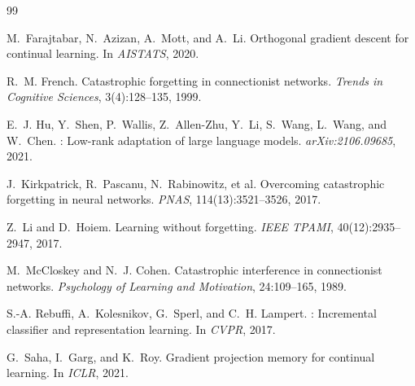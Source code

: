 \documentclass[11pt]{article}
\begin{document}

\begin{thebibliography}{99}

M.~Farajtabar, N.~Azizan, A.~Mott, and A.~Li.
\newblock Orthogonal gradient descent for continual learning.
\newblock In \emph{AISTATS}, 2020.

R.~M. French.
\newblock Catastrophic forgetting in connectionist networks.
\newblock \emph{Trends in Cognitive Sciences}, 3(4):128--135, 1999.

E.~J. Hu, Y.~Shen, P.~Wallis, Z.~Allen-Zhu, Y.~Li, S.~Wang, L.~Wang, and
W.~Chen.
: Low-rank adaptation of large language models.
\newblock \emph{arXiv:2106.09685}, 2021.

J.~Kirkpatrick, R.~Pascanu, N.~Rabinowitz, et al.
\newblock Overcoming catastrophic forgetting in neural networks.
\newblock \emph{PNAS}, 114(13):3521--3526, 2017.

Z.~Li and D.~Hoiem.
\newblock Learning without forgetting.
\newblock \emph{IEEE TPAMI}, 40(12):2935--2947, 2017.

M.~McCloskey and N.~J. Cohen.
\newblock Catastrophic interference in connectionist networks.
\newblock \emph{Psychology of Learning and Motivation}, 24:109--165, 1989.

S.-A. Rebuffi, A.~Kolesnikov, G.~Sperl, and C.~H. Lampert.
: Incremental classifier and representation learning.
\newblock In \emph{CVPR}, 2017.

G.~Saha, I.~Garg, and K.~Roy.
\newblock Gradient projection memory for continual learning.
\newblock In \emph{ICLR}, 2021.

\end{thebibliography}
\end{document}
